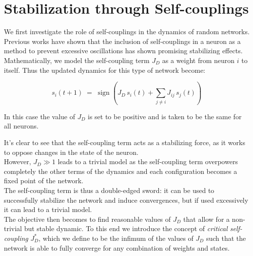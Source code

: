 \documentclass[a4paper,12pt]{report}
\begin{document}
\section{Stabilization through Self-couplings}\label{sec: sc_stabilization}

We first investigate the role of self-couplings in the dynamics of random networks.
Previous works have shown that the inclusion of self-couplings in a neuron as a 
method to prevent excessive oscillations has shown promising stabilizing effects.
\cite{Student2024} \\
Mathematically, we model the self-coupling term $J_D$ as a weight from neuron $i$ to 
itself. Thus the updated dynamics for this type of network become:

\begin{equation}\label{eq:Self_coupling_update}
  s_i(t+1) \;=\; \operatorname{sign}\left( J_D\,s_i(t) + \sum_{j\neq i} J_{ij}\,s_j(t) \right)
\end{equation}

In this case the value of $J_D$ is set to be positive and is taken to be the same for 
all neurons.
\vspace{0.5em}

It's clear to see that the self-coupling term acts as a stabilizing force, as it works
to oppose changes in the state of the neuron.\\
However, $J_D \gg 1$ leads to a trivial model as the self-coupling term overpowers 
completely the other terms of the dynamics and each configuration becomes a fixed point 
of the network.\\
The self-coupling term is thus a double-edged sword: it can be used to
successfully stabilize the network and induce convergences, but if used excessively 
it can lead to a trivial model. \\
The objective then becomes to find reasonable values of $J_D$ that allow for a non-trivial
but stable dynamic. To this end we introduce the concept of \emph{critical self-coupling} 
$J^*_D$, which we define to be the infimum of the values of $J_D$ such that the network 
is able to fully converge for any combination of weights and states.
\vspace{0.5em}
\end{document}
